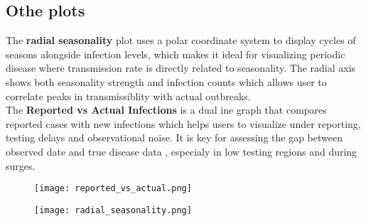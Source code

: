 \documentclass[11pt,a4paper]{article}
\theoremstyle{remark}\newtheorem{remark}{Remark}
\begin{document}
\subsection{Othe plots}
The \textbf{radial seasonality} plot uses a polar coordinate system to display cycles of seasons alongside infection levels, which makes it ideal for visualizing periodic disease where transmission rate is directly related to seasonality. The radial axis shows both seasonality strength and infection counts which allows user to correlate peaks in transmissiblity with actual outbreaks. \\
The \textbf{Reported vs Actual Infections} is a dual ine graph that compares reported cases with new infections which helps users to visualize under reporting, testing delays and observational noise. It is key for assessing the gap between observed date and true disease data , especialy in low testing regions and during surges. \\
\begin{figure}[H]
    \begin{minipage}{0.49\linewidth}
        \flushleft
        \texttt{[image: reported\_vs\_actual.png]}
    \end{minipage}
    \hfill
    \begin{minipage}{0.49\linewidth}
        \flushright
        \texttt{[image: radial\_seasonality.png]}
    \end{minipage}
    
    \caption{}
    \label{fig:seir-side-by-side}
\end{figure}
\end{document}
